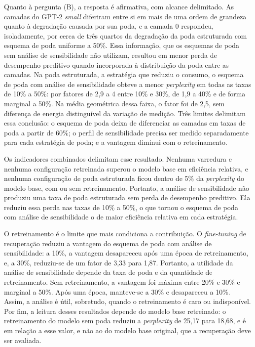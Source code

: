 Quanto à pergunta (B), a resposta é afirmativa, com alcance delimitado. As camadas do GPT-2
\textit{small} diferiram entre si em mais de uma ordem de grandeza quanto à degradação causada
por sua poda, e a camada 0 respondeu, isoladamente, por cerca de três quartos da degradação da
poda estruturada com esquema de poda uniforme a 50\%. Essa informação, que os esquemas de poda
sem análise de sensibilidade não utilizam, resultou em menor perda de desempenho preditivo
quando incorporada à distribuição da poda entre as camadas. Na poda estruturada, a estratégia
que reduziu o consumo, o esquema de poda com análise de sensibilidade obteve a menor
\textit{perplexity} em todas as taxas de 10\% a 50\%: por fatores de 2,9 a 4 entre 10\% e 30\%,
de 1,9 a 40\% e de forma marginal a 50\%. Na média geométrica dessa faixa, o fator foi de 2,5,
sem diferença de energia distinguível da variação de medição. Três limites delimitam essa
conclusão: o esquema de poda deixa de diferenciar as camadas em taxas de poda a partir de 60\%;
o perfil de sensibilidade precisa ser medido separadamente para cada estratégia de poda; e a
vantagem diminui com o retreinamento.

Os indicadores combinados delimitam esse resultado. Nenhuma varredura e nenhuma configuração
retreinada superou o modelo base em eficiência relativa, e nenhuma configuração de poda
estruturada ficou dentro de 5\% da \textit{perplexity} do modelo base, com ou sem
retreinamento. Portanto, a análise de sensibilidade não produziu uma taxa de poda estruturada
sem perda de desempenho preditivo. Ela reduziu essa perda nas taxas de 10\% a 50\%, o que
tornou o esquema de poda com análise de sensibilidade o de maior eficiência relativa em cada
estratégia.

O retreinamento é o limite que mais condiciona a contribuição. O \textit{fine-tuning} de
recuperação reduziu a vantagem do esquema de poda com análise de
sensibilidade: a 10\%, a vantagem desapareceu após uma época de retreinamento, e, a 30\%,
reduziu-se de um fator de 3,33 para 1,87. Portanto, a utilidade da análise de sensibilidade
depende da taxa de poda e da quantidade de retreinamento. Sem retreinamento, a vantagem foi
máxima entre 20\% e 30\% e marginal a 50\%. Após uma época, manteve-se a 30\% e desapareceu a
10\%. Assim, a análise é útil, sobretudo, quando o retreinamento é caro ou indisponível. Por
fim, a leitura desses resultados depende do modelo base retreinado: o retreinamento do modelo
sem poda reduziu a \textit{perplexity} de 25,17 para 18,68, e é em relação a esse valor, e não
ao do modelo base original, que a recuperação deve ser avaliada.
